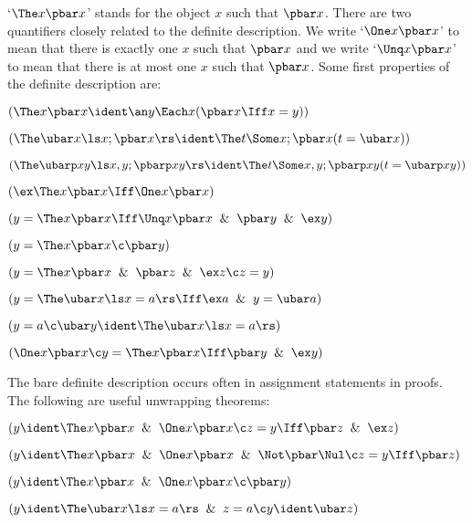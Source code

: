 
`$\The x \pbar x$' stands for the object $x$ such that $\pbar x$.  
There are two quantifiers closely related to the definite description.
We write `$\One x \pbar x$' to mean that there is exactly one $x$ such that $\pbar x$ and
we write `$\Unq x \pbar x$' to mean that there is at most one $x$ such that $\pbar x$. 
 Some first properties of the definite description are:
\lineb


 $(\The x \pbar x \ident \an y \Each x(\pbar x \Iff x = y))$

 $(\The \ubar x \ls x;\pbar x\rs \ident \The t \Some x;\pbar x (t = \ubar x))$ 

 $(\The \ubarp xy \ls x,y;\pbarp xy\rs \ident \The t \Some x,y;\pbarp xy (t = \ubarp xy))$ 

\lineb


 $(\ex \The x \pbar x \Iff \One x \pbar x)$

 $(y = \The x \pbar x \Iff \Unq x \pbar x \And \pbar y \And \ex y)$

 $(y= \The x \pbar x \c \pbar y)$

 $(y =\The x\pbar x \And \pbar z \And \ex z \c z=y)$

 $(y = \The \ubar x \ls x = a \rs
\Iff \ex a \And y = \ubar a)$

 $(y = a 
\c \ubar y \ident \The \ubar x \ls x = a \rs)$

 $(\One x \pbar x \c 
y = \The x\pbar x\Iff\pbar y\And \ex y)$
\lineb


The bare definite description occurs often in assignment statements in proofs.
The following are useful unwrapping theorems:
\lineb

 $(y \ident \The x \pbar x \And
\One x \pbar x \c z = y \Iff \pbar z \And \ex z)$

 $(y \ident \The x \pbar x \And
\One x \pbar x \And \Not \pbar \Nul \c
 z = y \Iff \pbar z )$

 $(y \ident \The x\pbar x \And \One x\pbar x \c \pbar y)$

 $(y \ident \The \ubar x\ls x = a\rs \And z = a \c y \ident \ubar z)$

\lineb



